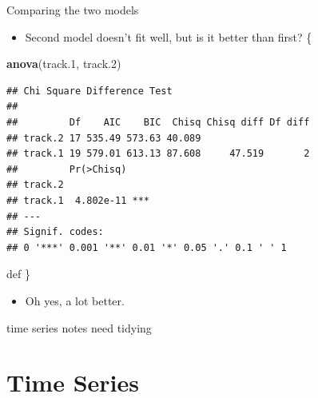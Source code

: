 \documentclass[ignorenonframetext,]{beamer}
\newenvironment{Shaded}{\begin{snugshade}}{\end{snugshade}}
\newcommand{\FloatTok}[1]{\textcolor[rgb]{0.00,0.00,0.81}{#1}}
\newcommand{\KeywordTok}[1]{\textcolor[rgb]{0.13,0.29,0.53}{\textbf{#1}}}
\newcommand{\NormalTok}[1]{#1}
\providecommand{\tightlist}{%
  \setlength{\itemsep}{0pt}\setlength{\parskip}{0pt}}
\begin{document}
\begin{frame}[fragile]{Comparing the two models}
\protect\hypertarget{comparing-the-two-models}{}

\begin{itemize}
\tightlist
\item
  Second model doesn't fit well, but is it better than first?
  \{\small    
\end{itemize}

\begin{Shaded}
\begin{Highlighting}[]
\KeywordTok{anova}\NormalTok{(track}\FloatTok{.1}\NormalTok{, track}\FloatTok{.2}\NormalTok{)}
\end{Highlighting}
\end{Shaded}

\begin{verbatim}
## Chi Square Difference Test
## 
##         Df    AIC    BIC  Chisq Chisq diff Df diff
## track.2 17 535.49 573.63 40.089                   
## track.1 19 579.01 613.13 87.608     47.519       2
##         Pr(>Chisq)    
## track.2               
## track.1  4.802e-11 ***
## ---
## Signif. codes:  
## 0 '***' 0.001 '**' 0.01 '*' 0.05 '.' 0.1 ' ' 1
\end{verbatim}

def \}

\begin{itemize}
\tightlist
\item
  Oh yes, a lot better.
\end{itemize}

time series notes need tidying

\end{frame}

\hypertarget{time-series}{%
\section{Time Series}\label{time-series}}
\end{document}
